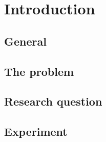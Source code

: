 \newpage

\section{Introduction}

\subsection{General}

\subsection{The problem}

\subsection{Research question}

\subsection{Experiment}
